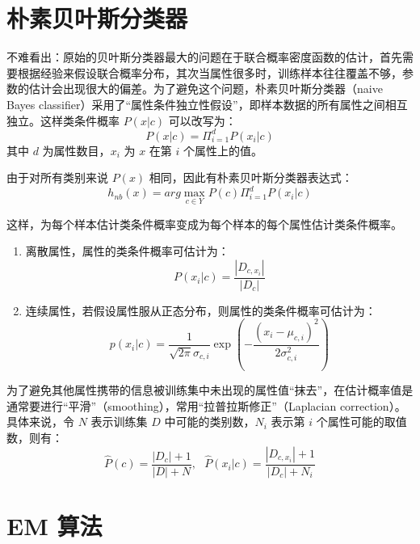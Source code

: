 \documentclass[12pt, a4paper]{article} %
\begin{document}
\section{朴素贝叶斯分类器}

不难看出：原始的贝叶斯分类器最大的问题在于联合概率密度函数的估计，首先需要根据经验来假设联合概率分布，其次当属性很多时，训练样本往往覆盖不够，参数的估计会出现很大的偏差。为了避免这个问题，朴素贝叶斯分类器（naive Bayes classifier）采用了“属性条件独立性假设”，即样本数据的所有属性之间相互独立。这样类条件概率 $P(x | c)$ 可以改写为：
\begin{equation*}
    P(x | c) = \Pi_{i = 1}^{d} P(x_i | c)
\end{equation*}
其中 $d$ 为属性数目，$x_i$ 为 $x$ 在第 $i$ 个属性上的值。

由于对所有类别来说 $P(x)$ 相同，因此有朴素贝叶斯分类器表达式：
\begin{equation*}
    h_{nb}(x) = arg \max_{c \in Y} P(c) \Pi_{i = 1}^{d} P(x_i | c)
\end{equation*}

这样，为每个样本估计类条件概率变成为每个样本的每个属性估计类条件概率。

\begin{enumerate}[\hspace*{2em} i.]
    \item 离散属性，属性的类条件概率可估计为：
    \begin{equation*}
        P(x_i | c) = \frac{|D_{c, x_i}|}{|D_c|}
    \end{equation*}
    \item 连续属性，若假设属性服从正态分布，则属性的类条件概率可估计为：
    \begin{equation*}
        p(x_i | c) = \frac{1}{\sqrt{2 \pi} \sigma_{c, i}} \exp (- \frac{(x_i - \mu_{c, i})^2}{2 \sigma_{c, i}^{2}})
    \end{equation*}
\end{enumerate}

为了避免其他属性携带的信息被训练集中未出现的属性值“抹去”，在估计概率值是通常要进行“平滑”（smoothing），常用“拉普拉斯修正”（Laplacian correction）。具体来说，令 $N$ 表示训练集 $D$ 中可能的类别数，$N_i$ 表示第 $i$ 个属性可能的取值数，则有：
\begin{equation*}
    \hat{P}(c) = \frac{|D_c| + 1}{|D| + N}, \ \ \ \hat{P}(x_i | c) = \frac{|D_{c, x_i}| + 1}{|D_c| + N_i}
\end{equation*}

\section{EM 算法}
\end{document}
